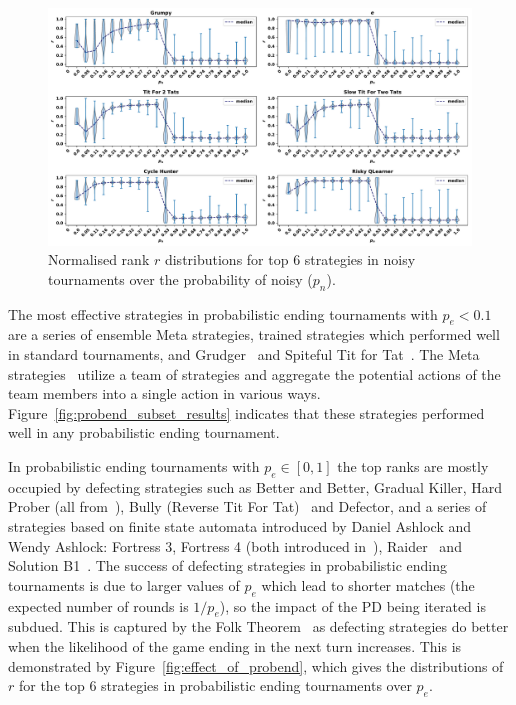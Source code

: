 \documentclass{article}
\begin{document}
\begin{figure}[!htbp]
    \centering
    \includegraphics[width=.92\textwidth]{../images/noise_effect.pdf}
    \caption{Normalised rank \(r\) distributions for top 6 strategies in noisy tournaments over
    the probability of noisy ($p_n$).}
    \label{fig:effect_of_noise}
\end{figure}

The most effective strategies in probabilistic ending
tournaments with \(p_e< 0.1\) are a series of ensemble Meta strategies, trained strategies
which performed well
in standard tournaments, and Grudger~\cite{axelrodproject} and Spiteful Tit for
Tat~\cite{prison}. The Meta strategies~\cite{axelrodproject} utilize a team of
strategies and aggregate the potential actions of the team members into a single action
in various ways. Figure~\ref{fig:probend_subset_results} indicates that these strategies
performed well in any probabilistic ending tournament.

In probabilistic ending tournaments with \(p_e \in [0, 1]\) the top ranks are
mostly occupied by defecting strategies such as Better and Better, Gradual
Killer, Hard Prober (all from~\cite{axelrodproject}), Bully (Reverse Tit For
Tat)~\cite{Nachbar1992} and Defector, and a series of strategies based on finite
state automata introduced by Daniel Ashlock and Wendy Ashlock: Fortress 3,
Fortress 4 (both introduced in~\cite{Ashlock2006}), Raider~\cite{Ashlock2014}
and Solution B1~\cite{Ashlock2014}. The success of defecting strategies in
probabilistic ending tournaments is due to larger values of
\(p_e\) which lead to shorter matches (the expected number of rounds is \(1 / p_e\)), so the
impact of the PD being iterated is subdued. This is captured by the Folk
Theorem~\cite{Fudenberg2009} as defecting strategies do better when the likelihood
of the game ending in the next turn increases.
This is demonstrated by Figure~\ref{fig:effect_of_probend}, which gives the
distributions of \(r\) for the top 6 strategies in probabilistic ending tournaments
over \(p_e\).
\end{document}
